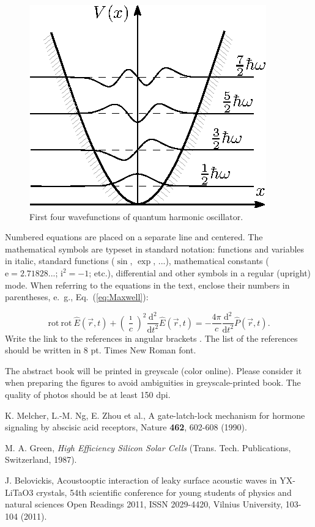 ﻿\documentclass[a4paper,10pt,english]{article}
\begin{document}
\begin{figure}[h]
\begin{centering}
\includegraphics{figure}
\par\end{centering}

\caption{\label{fig:Example_figure}First four wavefunctions of quantum harmonic
oscillator.}
\end{figure}
Numbered equations are placed on a separate line and centered. The mathematical symbols are typeset in standard notation: functions and variables in italic, standard functions ($\sin$, $\exp$, ...), mathematical constants ($\mathrm{e}=2.71828...$; $\mathrm{i}^2=-1$; etc.), differential and other symbols in a regular (upright) mode. When referring to the equations in the text, enclose their numbers in parentheses, e.~g., Eq.~(\ref{eq:Maxwell}):

\begin{equation}
\mathrm{rot}\:\mathrm{rot}\:\hat{E}(\vec{r},t)+\left(\frac{\imath}{c}\right)^{2}\frac{\mathrm{d}^{2}}{\mathrm{d}t^{2}}\hat{E}(\vec{r},t)=-\frac{4\pi}{c}\frac{\mathrm{d}^{2}}{\mathrm{d}t^{2}}\hat{P}(\vec{r},t).\label{eq:Maxwell}
\end{equation}
Write the link to the references in angular brackets \cite{key-1}. The list of the references should be written in 8 pt. Times New Roman font. 

The abstract book will be printed in greyscale (color online). Please consider it when preparing the figures to avoid ambiguities in greyscale-printed book. The quality of photos should be at least 150 dpi.

\begin{thebibliography}{References}

K. Melcher, L.-M. Ng, E. Zhou et al., A gate-latch-lock
mechanism for hormone signaling by abscisic acid receptors, Nature
\textbf{462}, 602-608 (1990).

M. A. Green, \textit{High Efficiency Silicon Solar
Cells} (Trans. Tech. Publications, Switzerland, 1987).

J. Belovickis, Acoustooptic interaction of leaky surface
acoustic waves in YX-LiTaO3 crystals, 54th scientific conference for
young students of physics and natural sciences Open Readings 2011,
ISSN 2029-4420, Vilnius University, 103-104 (2011).\end{thebibliography}
\end{document}
